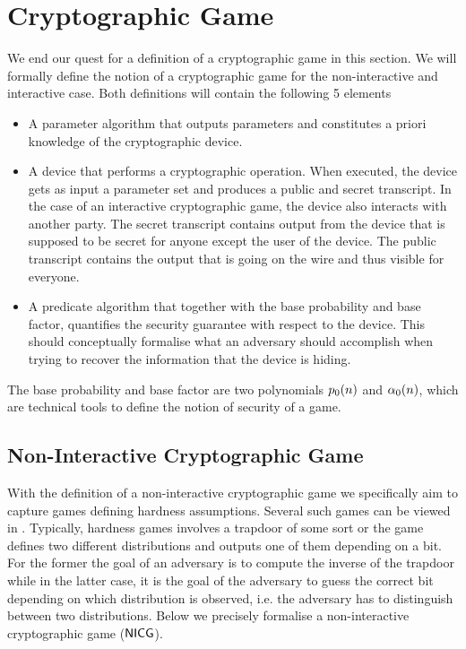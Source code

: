 \section{Cryptographic Game}

We end our quest for a definition of a cryptographic game in this section. We will formally define the notion of a cryptographic game for the non-interactive and interactive case. Both definitions will contain the following 5 elements 

\begin{itemize}
	\itemsep-0.1em
	\item A parameter algorithm that outputs parameters and constitutes a priori knowledge of the cryptographic device. 
	\item A device that performs a cryptographic operation. When executed, the device gets as input a parameter set and produces a public and secret transcript. In the case of an interactive cryptographic game, the device also interacts with another party. The secret transcript contains output from the device that is supposed to be secret for anyone except the user of the device. The public transcript contains the output that is going on the wire and thus visible for everyone. 
	\item A predicate algorithm that together with the base probability and base factor, quantifies the security guarantee with respect to the device. This should conceptually formalise what an adversary should accomplish when trying to recover the information that the device is hiding.  
\end{itemize}

The base probability and base factor are two polynomials $p_{0}(n)$ and $\alpha_{0}(n)$, which are technical tools to define the notion of security of a game. 

\subsection{Non-Interactive Cryptographic Game}

\begin{comment}
Complete details follow below. A plethora of examples are given in the coming chapters. 	
\end{comment}

With the definition of a non-interactive cryptographic game we specifically aim to capture games defining hardness assumptions. Several such games can be viewed in . Typically, hardness games involves a trapdoor of some sort or the game defines two different distributions and outputs one of them depending on a bit. For the former the goal of an adversary is to compute the inverse of the trapdoor while in the latter case, it is the goal of the adversary to guess the correct bit depending on which distribution is observed, i.e. the adversary has to distinguish between two distributions. Below we precisely formalise a non-interactive cryptographic game ($\mathsf{NICG}$). 

